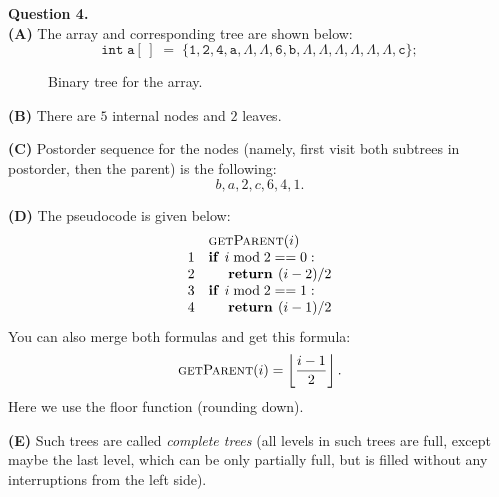 \documentclass[a4paper,12pt]{article}
\begin{document}
\vspace{20pt}
{\bf Question 4.}\\
{\bf (A)} The array and corresponding tree are shown below: 
$$\mathtt{int\;a[\,]\;=\;\{1, 2, 4, a, \Lambda, \Lambda, 6, b, \Lambda, \Lambda, \Lambda, \Lambda, \Lambda, \Lambda, c\};}$$

\begin{figure}[!htb]
\caption{\label{fig:prob4-midterm-binary-tree} Binary tree for the array.}
\end{figure}

\vspace{5pt}
{\bf (B)} There are $5$ internal nodes and $2$ leaves. 

\vspace{5pt}
{\bf (C)} Postorder sequence for the nodes (namely, first visit both subtrees in postorder, then the parent)
is the following: 
$$b,a,2,c,6,4,1.$$

\vspace{5pt}
{\bf (D)} The pseudocode is given below:
\[
\begin{array}{rl}
 & \text{\sc getParent}(i)\\
1 & \text{\textbf{if\ }}i\;\text{mod}\;2 ==0:\\
2 & \hspace{.5cm} \text{\textbf{return\ }} (i-2)/2\\
3 & \text{\textbf{if\ }}i\;\text{mod}\;2 ==1:\\
4 & \hspace{.5cm} \text{\textbf{return\ }} (i-1)/2\\
\end{array}
\]
You can also merge both formulas and get this formula:
$$\text{\sc getParent}(i) = \left\lfloor \frac{i-1}{2} \right\rfloor.$$
Here we use the floor function (rounding down). 

\vspace{5pt}
{\bf (E)} Such trees are called {\em complete trees} (all levels in such trees are full, 
except maybe the last level, which can be only partially full, but is filled
without any interruptions from the left side). 
\end{document}
